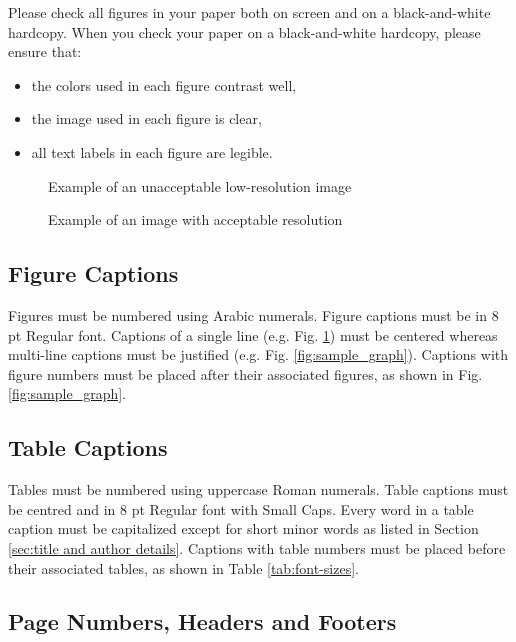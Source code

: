 \documentclass[10pt,conference,a4paper]{IEEEtran}
\begin{document}
Please check all figures in your paper both on screen and on a
black-and-white hardcopy.  When you check your paper on a
black-and-white hardcopy, please ensure that:

\begin{itemize}
\item	the colors used in each figure contrast well,
\item	the image used in each figure is clear,
\item	all text labels in each figure are legible.
\end{itemize}

\begin{figure}[h]
	\centerline{ }
	\caption{Example of an unacceptable low-resolution image}
	\label{fig:lores-photo}
\end{figure}

\begin{figure}[h]
	\centerline{ }
	\caption{Example of an image with acceptable resolution}
	\label{fig:hires-photo}
\end{figure}

\subsection{Figure Captions}

Figures must be numbered using Arabic numerals.  Figure captions must
be in 8 pt Regular font.  Captions of a single line (e.g. Fig.
\ref{fig:lores-photo}) must be centered whereas multi-line captions
must be justified (e.g. Fig.  \ref{fig:sample_graph}).  Captions with
figure numbers must be placed after their associated figures, as shown
in Fig. \ref{fig:sample_graph}.

\subsection{Table Captions}

Tables must be numbered using uppercase Roman numerals.  Table
captions must be centred and in 8 pt Regular font with Small Caps.
Every word in a table caption must be capitalized except for short
minor words as listed in Section \ref{sec:title and author details}.
Captions with table numbers must be placed before their associated
tables, as shown in Table \ref{tab:font-sizes}.

\subsection{Page Numbers, Headers and Footers}
\end{document}
